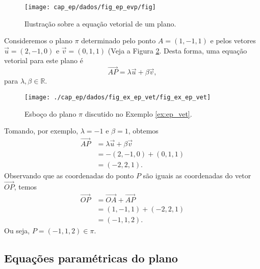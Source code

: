 \begin{figure}[H]
  \centering
  \texttt{[image: cap\_ep/dados/fig\_ep\_evp/fig]}
  \caption{Ilustração sobre a equação vetorial de um plano.}
  \label{fig:ep_evp}
\end{figure}


\begin{ex}\label{ex:ep_vet}
  Consideremos o plano $\pi$ determinado pelo ponto $A = (1,-1,1)$ e pelos vetores $\vec{u} = (2,-1,0)$ e $\vec{v} = (0,1,1)$ (Veja a Figura \ref{fig:ex_ep_vet}. Desta forma, uma equação vetorial para este plano é
  \begin{equation}
    \overrightarrow{AP} = \lambda\vec{u}+\beta\vec{v},
  \end{equation}
  para $\lambda,\beta\in\mathbb{R}$.
  
  \begin{figure}[H]
    \centering
    \texttt{[image: ./cap\_ep/dados/fig\_ex\_ep\_vet/fig\_ex\_ep\_vet]}
    \caption{Esboço do plano $\pi$ discutido no Exemplo \ref{ex:ep_vet}.}
    \label{fig:ex_ep_vet}
  \end{figure}
  
  Tomando, por exemplo, $\lambda = -1$ e $\beta = 1$, obtemos
  \begin{align}
    \overrightarrow{AP} &= \lambda\vec{u}+\beta\vec{v}\\
                        &= -(2,-1,0) + (0,1,1)\\
                        &= (-2,2,1).
  \end{align}
  Observando que as coordenadas do ponto $P$ são iguais as coordenadas do vetor $\overrightarrow{OP}$, temos
  \begin{align}
    \overrightarrow{OP} &= \overrightarrow{OA}+\overrightarrow{AP}\\
                        &= (1,-1,1)+(-2,2,1)\\
                        &= (-1,1,2).
  \end{align}
  Ou seja, $P = (-1,1,2)\in\pi$.
\end{ex}

\subsection{Equações paramétricas do plano}

